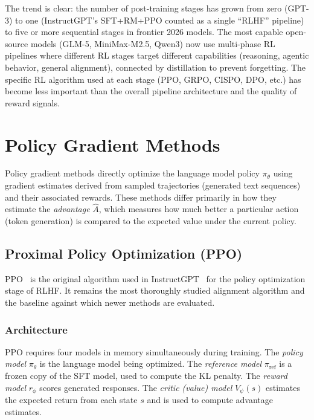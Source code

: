 \documentclass[12pt]{article}
\begin{document}
The trend is clear: the number of post-training stages has grown from zero (GPT-3) to one (InstructGPT's SFT+RM+PPO counted as a single ``RLHF'' pipeline) to five or more sequential stages in frontier 2026 models. The most capable open-source models (GLM-5, MiniMax-M2.5, Qwen3) now use multi-phase RL pipelines where different RL stages target different capabilities (reasoning, agentic behavior, general alignment), connected by distillation to prevent forgetting. The specific RL algorithm used at each stage (PPO, GRPO, CISPO, DPO, etc.) has become less important than the overall pipeline architecture and the quality of reward signals.


\section{Policy Gradient Methods}

Policy gradient methods directly optimize the language model policy $\pi_\theta$ using gradient estimates derived from sampled trajectories (generated text sequences) and their associated rewards. These methods differ primarily in how they estimate the \textit{advantage} $\hat{A}$, which measures how much better a particular action (token generation) is compared to the expected value under the current policy.

\subsection{Proximal Policy Optimization (PPO)}

PPO~\cite{Schulman2017PPO} is the original algorithm used in InstructGPT~\cite{Ouyang2022InstructGPT} for the policy optimization stage of RLHF. It remains the most thoroughly studied alignment algorithm and the baseline against which newer methods are evaluated.

\subsubsection{Architecture}

PPO requires four models in memory simultaneously during training. The \textit{policy model} $\pi_\theta$ is the language model being optimized. The \textit{reference model} $\pi_{\text{ref}}$ is a frozen copy of the SFT model, used to compute the KL penalty. The \textit{reward model} $r_\phi$ scores generated responses. The \textit{critic (value) model} $V_\psi(s)$ estimates the expected return from each state $s$ and is used to compute advantage estimates.
\end{document}
